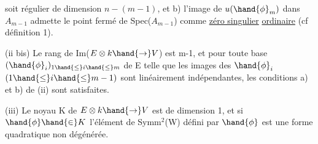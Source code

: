 
soit  régulier de dimension $n-(m-1)$, et b) l'image de $u(\hand{\phi}_m)$
dans $A_{m-1}$ admette le point fermé de Spec($A_{m-1}$) comme \uline{zéro singulier}
\uline{ordinaire} (cf définition 1).

(ii bis)  Le rang de Im($E\otimes k \hand{\to} V$) est m-1, et pour
toute base $(\hand{\phi}_i)_{1\hand{\leq} i\hand{\leq} m}$ de E telle que les images des $\hand{\phi}_i$ $(1\hand{\leq} i\hand{\leq} m-1)$ 
sont linéairement indépendantes, les conditions a) et b) de (ii) sont
satisfaites.

(iii) Le noyau  K de $E\otimes k \hand{\to} V$ est de dimension 1, et si $\hand{\phi}\hand{\in} K$
 l'élément de Symm$^2$(W) défini par $\hand{\phi}$ est une forme quadratique
non dégénérée.

